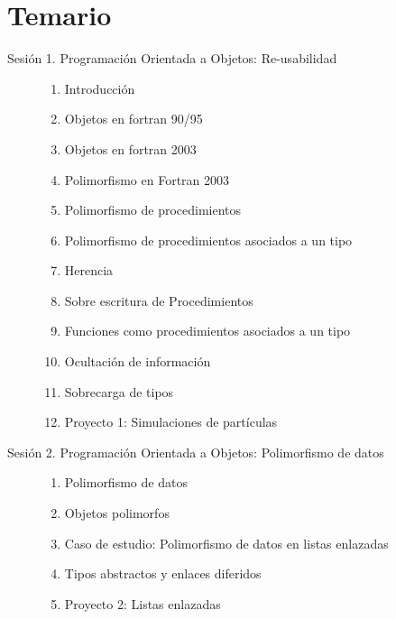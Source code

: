\section{Temario}


\begin{description}
  \item[Sesión 1. Programación Orientada a Objetos: Re-usabilidad]\hfill
    \begin{enumerate}
      \item Introducción
      \item Objetos en fortran 90/95
      \item Objetos en fortran 2003
      \item Polimorfismo en Fortran 2003
      \item Polimorfismo de procedimientos
      \item Polimorfismo de procedimientos asociados a un tipo
      \item Herencia
      \item Sobre escritura de Procedimientos
      \item Funciones como procedimientos asociados a un tipo
      \item Ocultación de información
      \item Sobrecarga de tipos
      \item Proyecto 1: Simulaciones de partículas
    \end{enumerate}

  \item[Sesión 2. Programación Orientada a Objetos: Polimorfismo de datos]\hfill
    \begin{enumerate}
      \item Polimorfismo de datos
      \item Objetos polimorfos
      \item Caso de estudio: Polimorfismo de datos en listas enlazadas
      \item Tipos abstractos y enlaces diferidos
      \item Proyecto 2: Listas enlazadas
    \end{enumerate}


\end{description}
